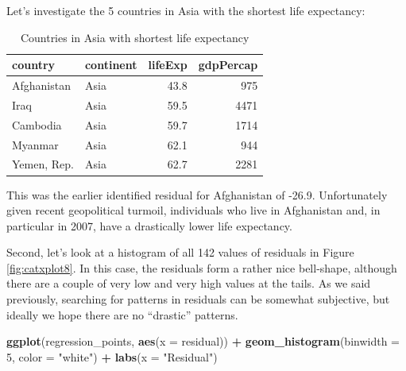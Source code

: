 \documentclass[12pt,]{krantz}
\makeatletter
\newenvironment{Shaded}{\begin{snugshade}}{\end{snugshade}}
\newcommand{\KeywordTok}[1]{\textcolor[rgb]{0.27,0.27,0.27}{\textbf{#1}}}
\newcommand{\DataTypeTok}[1]{\textcolor[rgb]{0.27,0.27,0.27}{#1}}
\newcommand{\DecValTok}[1]{\textcolor[rgb]{0.06,0.06,0.06}{#1}}
\newcommand{\StringTok}[1]{\textcolor[rgb]{0.5,0.5,0.5}{#1}}
\newcommand{\OperatorTok}[1]{\textcolor[rgb]{0.43,0.43,0.43}{\textbf{#1}}}
\newcommand{\NormalTok}[1]{#1}
\newenvironment{kframe}{%
\medskip{}
\setlength{\fboxsep}{.8em}
 \def\at@end@of@kframe{}%
 \ifinner\ifhmode%
  \def\at@end@of@kframe{\end{minipage}}%
  \begin{minipage}{\columnwidth}%
 \fi\fi%
 \def\FrameCommand##1{\hskip\@totalleftmargin \hskip-\fboxsep
 \colorbox{shadecolor}{##1}\hskip-\fboxsep
     \hskip-\linewidth \hskip-\@totalleftmargin \hskip\columnwidth}%
 \MakeFramed {\advance\hsize-\width
   \@totalleftmargin\z@ \linewidth\hsize
   \@setminipage}}%
 {\par\unskip\endMakeFramed%
 \at@end@of@kframe}
\renewenvironment{Shaded}{\begin{kframe}}{\end{kframe}}
\theoremstyle{definition}
\theoremstyle{definition}
\theoremstyle{definition}
\theoremstyle{remark}
\makeatother
\begin{document}
Let's investigate the 5 countries in Asia with the shortest life
expectancy:

\begin{Shaded}
\end{Shaded}

\begin{table}[H]

\caption{\label{tab:unnamed-chunk-203}Countries in Asia with shortest life expectancy}
\centering
\fontsize{10}{12}\selectfont
\begin{tabular}[t]{llrr}
\toprule
country & continent & lifeExp & gdpPercap\\
\midrule
Afghanistan & Asia & 43.8 & 975\\
Iraq & Asia & 59.5 & 4471\\
Cambodia & Asia & 59.7 & 1714\\
Myanmar & Asia & 62.1 & 944\\
Yemen, Rep. & Asia & 62.7 & 2281\\
\bottomrule
\end{tabular}
\end{table}

This was the earlier identified residual for Afghanistan of -26.9.
Unfortunately given recent geopolitical turmoil, individuals who live in
Afghanistan and, in particular in 2007, have a drastically lower life
expectancy.

Second, let's look at a histogram of all 142 values of residuals in
Figure \ref{fig:catxplot8}. In this case, the residuals form a rather
nice bell-shape, although there are a couple of very low and very high
values at the tails. As we said previously, searching for patterns in
residuals can be somewhat subjective, but ideally we hope there are no
``drastic'' patterns.

\begin{Shaded}
\begin{Highlighting}[]
\KeywordTok{ggplot}\NormalTok{(regression_points, }\KeywordTok{aes}\NormalTok{(}\DataTypeTok{x =}\NormalTok{ residual)) }\OperatorTok{+}
\StringTok{  }\KeywordTok{geom_histogram}\NormalTok{(}\DataTypeTok{binwidth =} \DecValTok{5}\NormalTok{, }\DataTypeTok{color =} \StringTok{"white"}\NormalTok{) }\OperatorTok{+}
\StringTok{  }\KeywordTok{labs}\NormalTok{(}\DataTypeTok{x =} \StringTok{"Residual"}\NormalTok{)}
\end{Highlighting}
\end{Shaded}
\end{document}
